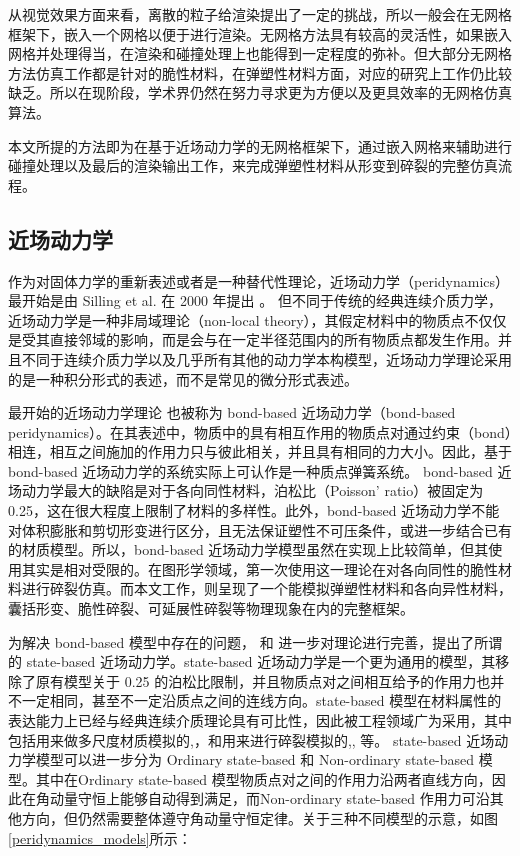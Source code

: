 从视觉效果方面来看，离散的粒子给渲染提出了一定的挑战，所以一般会在无网格框架下，嵌入一个网格以便于进行渲染。无网格方法具有较高的灵活性，如果嵌入网格并处理得当，在渲染和碰撞处理上也能得到一定程度的弥补。但大部分无网格方法仿真工作都是针对的脆性材料，在弹塑性材料方面，对应的研究上工作仍比较缺乏。所以在现阶段，学术界仍然在努力寻求更为方便以及更具效率的无网格仿真算法。

本文所提的方法即为在基于近场动力学的无网格框架下，通过嵌入网格来辅助进行碰撞处理以及最后的渲染输出工作，来完成弹塑性材料从形变到碎裂的完整仿真流程。

\subsection{近场动力学}
\label{pdm_history}

作为对固体力学的重新表述或者是一种替代性理论，近场动力学（peridynamics）最开始是由 Silling et al. 在 2000 年提出 。 但不同于传统的经典连续介质力学，近场动力学是一种非局域理论（non-local theory），其假定材料中的物质点不仅仅是受其直接邻域的影响，而是会与在一定半径范围内的所有物质点都发生作用。并且不同于连续介质力学以及几乎所有其他的动力学本构模型，近场动力学理论采用的是一种积分形式的表述，而不是常见的微分形式表述。

最开始的近场动力学理论 也被称为 bond-based 近场动力学（bond-based peridynamics）。在其表述中，物质中的具有相互作用的物质点对通过约束（bond）相连，相互之间施加的作用力只与彼此相关，并且具有相同的力大小。因此，基于 bond-based 近场动力学的系统实际上可认作是一种质点弹簧系统。 bond-based 近场动力学最大的缺陷是对于各向同性材料，泊松比（Poisson' ratio）被固定为 0.25，这在很大程度上限制了材料的多样性。此外，bond-based 近场动力学不能对体积膨胀和剪切形变进行区分，且无法保证塑性不可压条件，或进一步结合已有的材质模型。所以，bond-based 近场动力学模型虽然在实现上比较简单，但其使用其实是相对受限的。在图形学领域，第一次使用这一理论在对各向同性的脆性材料进行碎裂仿真。而本文工作，则呈现了一个能模拟弹塑性材料和各向异性材料，囊括形变、脆性碎裂、可延展性碎裂等物理现象在内的完整框架。

为解决 bond-based 模型中存在的问题， 和 进一步对理论进行完善，提出了所谓的 state-based 近场动力学。state-based 近场动力学是一个更为通用的模型，其移除了原有模型关于 0.25 的泊松比限制，并且物质点对之间相互给予的作用力也并不一定相同，甚至不一定沿质点之间的连线方向。state-based 模型在材料属性的表达能力上已经与经典连续介质理论具有可比性，因此被工程领域广为采用，其中包括用来做多尺度材质模拟的,，和用来进行碎裂模拟的,, 等。
state-based 近场动力学模型可以进一步分为 Ordinary state-based 和 Non-ordinary state-based 模型。其中在Ordinary state-based 模型物质点对之间的作用力沿两者直线方向，因此在角动量守恒上能够自动得到满足，而Non-ordinary state-based 作用力可沿其他方向，但仍然需要整体遵守角动量守恒定律。关于三种不同模型的示意，如图\ref{peridynamics_models}所示：

